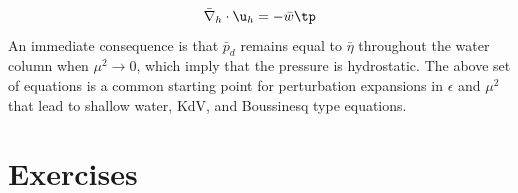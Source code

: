 \documentclass[graybox,envcountchap,sectrefs,final]{svmonodo}
\begin{document}
\begin{equation}
\label{scale:surfacewave:kinbott3}
\bar\nabla_h\cdot\u_h =-\bar w\tp
\end{equation}
An immediate consequence is that $\bar p_d$ remains equal to $\bar \eta$ throughout the water column when $\mu^2\rightarrow 0$, which imply that the pressure
is hydrostatic. The above set of equations is a common  starting point for
perturbation expansions in $\epsilon$ and $\mu^2$ that lead to shallow water,
KdV, and Boussinesq type equations.



\section{Exercises}
\end{document}
